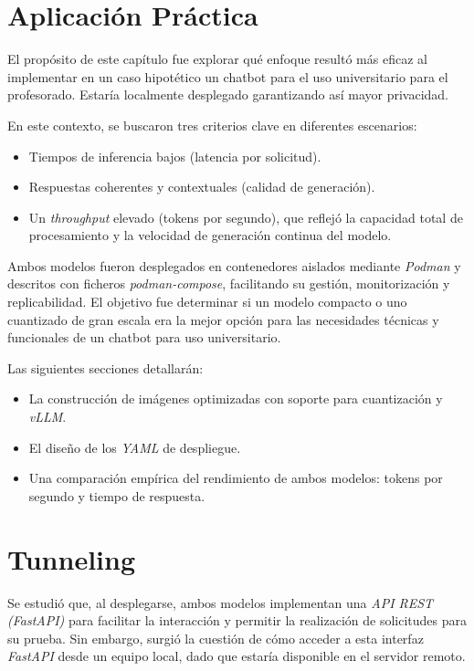 \section{Aplicación Práctica}
El propósito de este capítulo fue explorar qué enfoque resultó más eficaz al implementar en un caso hipotético un chatbot para el uso universitario para el profesorado. Estaría localmente desplegado garantizando así mayor privacidad.

\noindent En este contexto, se buscaron tres criterios clave en diferentes escenarios:
\begin{itemize}
    \item Tiempos de inferencia bajos (latencia por solicitud).
    \item Respuestas coherentes y contextuales (calidad de generación).
    \item Un \textit{throughput} elevado (tokens por segundo), que reflejó la capacidad total de procesamiento y la velocidad de generación continua del modelo.
\end{itemize}
Ambos modelos fueron desplegados en contenedores aislados mediante \textit{Podman} \cite{ref75} y descritos con ficheros \textit{podman-compose}, facilitando su gestión, monitorización y replicabilidad. El objetivo fue determinar si un modelo compacto o uno cuantizado de gran escala era la mejor opción para las necesidades técnicas y funcionales de un chatbot para uso universitario.

\noindent Las siguientes secciones detallarán:
\begin{itemize}
    \item La construcción de imágenes optimizadas con soporte para cuantización y \textit{vLLM}.
    \item El diseño de los \textit{YAML} de despliegue.
    \item Una comparación empírica del rendimiento de ambos modelos: tokens por segundo y tiempo de respuesta.
\end{itemize}

\section{Tunneling}
Se estudió que, al desplegarse, ambos modelos implementan una \textit{API REST (FastAPI)} para facilitar la interacción y permitir la realización de solicitudes para su prueba. Sin embargo, surgió la cuestión de cómo acceder a esta interfaz \textit{FastAPI} desde un equipo local, dado que estaría disponible en el servidor remoto.

